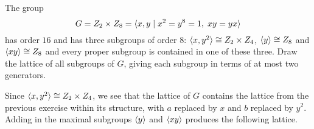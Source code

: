  The group
\begin{equation*}
  G = Z_2\times Z_8 = \langle{x,y\mid x^2 = y^8 = 1,\; xy = yx}\rangle
\end{equation*}
has order $16$ and has three subgroups of order $8$:
$\langle{x,y^2}\rangle\cong Z_2\times Z_4$, $\langle{y}\rangle\cong Z_8$ and
$\langle{xy}\rangle\cong Z_8$ and every proper subgroup is contained in one of
these three. Draw the lattice of all subgroups of $G$, giving each
subgroup in terms of at most two generators.
\begin{solution}
  Since $\langle{x,y^2}\rangle\cong Z_2\times Z_4$, we see that the lattice of
  $G$ contains the lattice from the previous exercise within its
  structure, with $a$ replaced by $x$ and $b$ replaced by
  $y^2$. Adding in the maximal subgroups $\langle{y}\rangle$ and $\langle{xy}\rangle$
  produces the following lattice.
  \begin{center}
  \end{center}
\end{solution}
